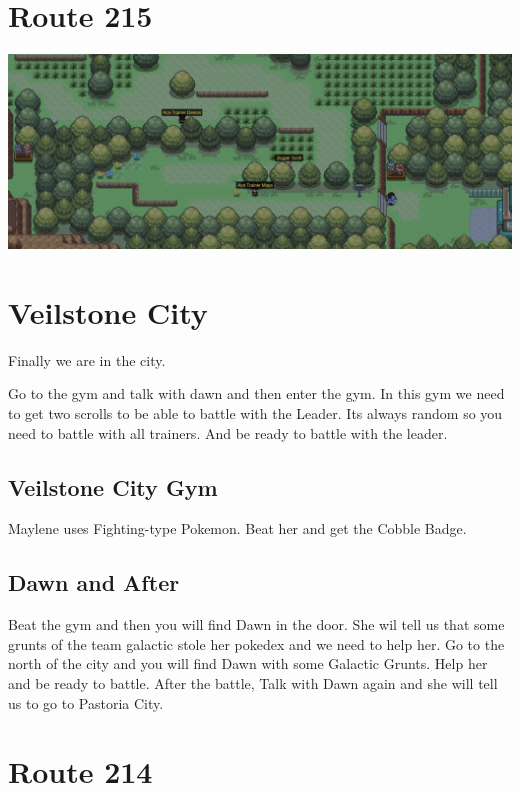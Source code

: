 \documentclass[11pt]{article}
\begin{document}
\section{Route 215}\label{sec:Route_215}

\includegraphics[width=\textwidth]{walkthrough/Sinnoh/Route_215}



\section{Veilstone City}\label{sec:veilstone-city}
Finally we are in the city.

Go to the gym and talk with dawn and then enter the gym.
In this gym we need to get two scrolls to be able to battle with the Leader.
Its always random so you need to battle with all trainers.
And be ready to battle with the leader.

\subsection{Veilstone City Gym}\label{subsec:veilstone-city-gym}
Maylene uses Fighting-type Pokemon.
Beat her and get the Cobble Badge.

\subsection{Dawn and After}\label{subsec:dawn-and-after}
Beat the gym and then you will find Dawn in the door.
She wil tell us that some grunts of the team galactic stole her pokedex and we need to help her.
Go to the north of the city and you will find Dawn with some Galactic Grunts.
Help her and be ready to battle.
After the battle, Talk with Dawn again and she will tell us to go to Pastoria City.

\section{Route 214}\label{sec:Route_214}
\end{document}
